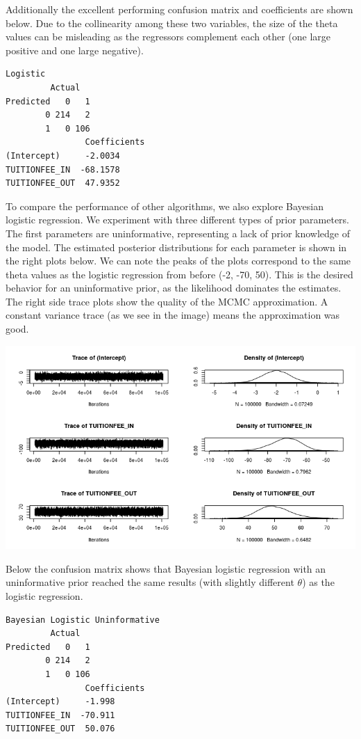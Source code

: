\documentclass[10pt]{article}
\begin{document}
Additionally the excellent performing confusion matrix and coefficients are shown below. Due to the collinearity among these two variables, the size of the theta values can be misleading as the regressors complement each other (one large positive and one large negative).

\begin{lstlisting}
Logistic
         Actual
Predicted   0   1
        0 214   2
        1   0 106
        		Coefficients
(Intercept)     -2.0034 
TUITIONFEE_IN  -68.1578
TUITIONFEE_OUT  47.9352
\end{lstlisting}

To compare the performance of other algorithms, we also explore Bayesian logistic regression. We experiment with three different types of prior parameters. The first parameters are uninformative, representing a lack of prior knowledge of the model. The estimated posterior distributions for each parameter is shown in the right plots below. We can note the peaks of the plots correspond to the same theta values as the logistic regression from before (-2, -70, 50). This is the desired behavior for an uninformative prior, as the likelihood dominates the estimates. The right side trace plots show the quality of the MCMC approximation. A constant variance trace (as we see in the image) means the approximation was good.

\includegraphics[width=\textwidth]{figures/tuition-uninform-densities}

Below the confusion matrix shows that Bayesian logistic regression with an uninformative prior reached the same results (with slightly different $\theta$) as the logistic regression.

\begin{lstlisting}
Bayesian Logistic Uninformative
         Actual
Predicted   0   1
        0 214   2
        1   0 106
        		Coefficients
(Intercept)     -1.998
TUITIONFEE_IN  -70.911
TUITIONFEE_OUT  50.076
\end{lstlisting}
\end{document}
